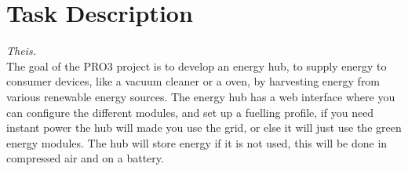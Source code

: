 \section{Task Description}\textit{Theis.}\\
The goal of the PRO3 project is to develop an energy hub, to supply energy to consumer devices, like a vacuum cleaner or a oven, by harvesting energy from various renewable energy sources. The energy hub has a web interface where you can configure the different modules, and set up a fuelling profile, if you need instant power the hub will made you use the grid, or else it will just use the green energy modules. The hub will store energy if it is not used, this will be done in compressed air and on a battery.